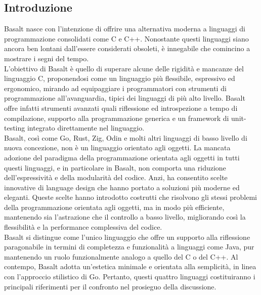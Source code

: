 \subsection{Introduzione}
Basalt nasce con l'intenzione di offrire una alternativa moderna a linguaggi di programmazione consolidati come C e C++. Nonostante 
questi linguaggi siano ancora ben lontani dall'essere considerati obsoleti, è innegabile che comincino a mostrare i segni del tempo. \\

L'obiettivo di Basalt è quello di superare alcune delle rigidità e mancanze del linguaggio C, proponendosi come un linguaggio più flessibile, 
espressivo ed ergonomico, mirando ad equipaggiare i programmatori con strumenti di programmazione all'avanguardia, tipici dei linguaggi di più alto livello. Basalt 
offre infatti strumenti avanzati quali riflessione ed introspezione a tempo di compilazione, supporto alla programmazione generica e un framework di unit-testing 
integrato direttamente nel linguaggio. \\

Basalt, così come Go, Rust, Zig, Odin e molti altri linguaggi di basso livello di nuova concezione, non è un linguaggio orientato agli oggetti. La mancata adozione del
paradigma della programmazione orientata agli oggetti in tutti questi linguaggi, e in particolare in Basalt, non comporta una riduzione dell’espressività e della modularità
del codice. Anzi, ha consentito scelte innovative di language design che hanno portato a soluzioni più moderne ed eleganti. Queste scelte hanno introdotto costrutti che
risolvono gli stessi problemi della programmazione orientata agli oggetti, ma in modo più efficiente, mantenendo sia l’astrazione che il controllo a basso livello,
migliorando così la flessibilità e la performance complessiva del codice. \\

Basalt si distingue come l'unico linguaggio che offre un supporto alla riflessione paragonabile in termini di completezza e funzionalità a linguaggi come Java, 
pur mantenendo un ruolo funzionalmente analogo a quello del C o del C++. Al contempo, Basalt adotta un'estetica minimale e orientata alla semplicità, in linea con 
l'approccio stilistico di Go. Pertanto, questi quattro linguaggi costituiranno i principali riferimenti per il confronto nel prosieguo della discussione. \\

\newpage
 \newpage
 \newpage
 \newpage
